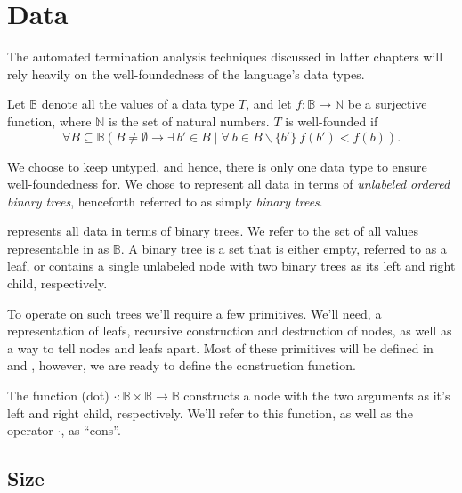 \section{Data}

The automated termination analysis techniques discussed in latter chapters will
rely heavily on the well-foundedness of the language's data types.

\begin{definition}\label{definition:well-foundedness} Let $\mathbb{B}$ denote
all the values of a data type $T$, and let $f:\mathbb{B}\rightarrow \mathbb{N}$
be a surjective function, where $\mathbb{N}$ is the set of natural numbers. $T$
is well-founded if $$\forall B\subseteq \mathbb{B} \left( B \neq \emptyset
\rightarrow \exists\ b' \in B \mid \forall\ b\in B\backslash\{b'\}\ f(b') <
f(b)\right).$$\end{definition}

We choose to keep \D{} untyped, and hence, there is only one data type to
ensure well-foundedness for. We chose to represent all data in terms of
\emph{unlabeled ordered binary trees}, henceforth referred to as simply
\emph{binary trees}.

\begin{definition}\label{definition:values} \D{} represents all data in terms
of binary trees. We refer to the set of all values representable in \D{} as
$\mathbb{B}$. A binary tree is a set that is either empty, referred to as a
leaf, or contains a single unlabeled node with two binary trees as its left and
right child, respectively.\end{definition}

To operate on such trees we'll require a few primitives. We'll need, a
representation of leafs, recursive construction and destruction of nodes, as
well as a way to tell nodes and leafs apart. Most of these primitives will be
defined in  and , however, we
are ready to define the construction function.

\begin{definition} The function (dot) $\cdot
:\mathbb{B}\times\mathbb{B}\rightarrow\mathbb{B}$ constructs a node with the
two arguments as it's left and right child, respectively. We'll refer to this
function, as well as the operator $\cdot$, as ``cons''.\end{definition}

\subsection{Size}

